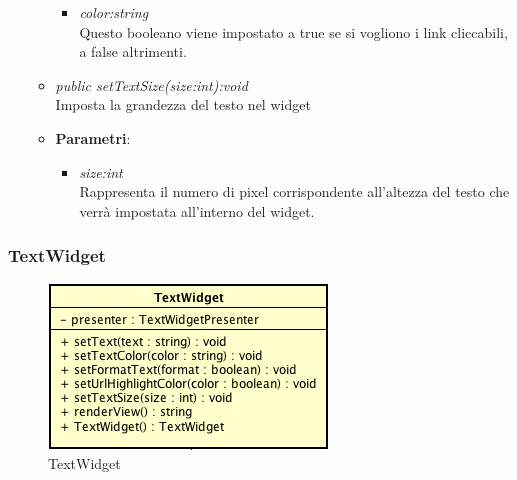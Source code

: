 \begin{itemize}
\begin{itemize}
{\begin{itemize}
		\item \textit{color:string}\\
		Questo booleano viene impostato a true se si vogliono i link cliccabili, a false altrimenti.
		\end{itemize}}
	\item \textit{public setTextSize(size:int):void}\\
	Imposta la grandezza del testo nel widget
		\item{\textbf{Parametri}: \begin{itemize}
		\item \textit{size:int}\\
		Rappresenta il numero di pixel corrispondente all'altezza del testo che verrà impostata all'interno del widget.
		\end{itemize}}
	\end{itemize}
\end{itemize}

\subsubsection{TextWidget}

\label{TextWidget}
\begin{figure}[ht]
	\centering
	\includegraphics[scale=0.5]{Sezioni/SottosezioniST/img/TextWidget.png}
	\caption{TextWidget}
\end{figure}

